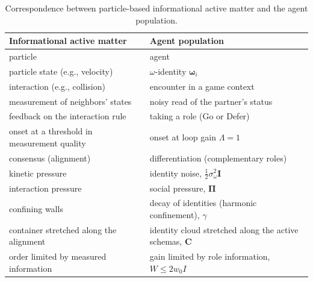 \documentclass[
  aps,prx,
  reprint,
  superscriptaddress,
  nofootinbib,
  longbibliography
]{revtex4-2}
\newcommand{\w}{\bm{\omega}}
\newcommand{\C}{\mathbf{C}}
\newcommand{\Id}{\mathbf{I}}
\newcommand{\sidn}{\sigma_{\omega}}
\begin{document}
\begin{table}[t]
\caption{Correspondence between particle-based informational active matter \cite{vansaders2023,ziepke2022} and the agent population.}
\label{tab:map}
\centering
{}
\begin{tabular}{>{\raggedright\arraybackslash}p{}>{\raggedright\arraybackslash}p{}}
\hline\hline
Informational active matter & Agent population\\
\hline
particle & agent\\
particle state (e.g., velocity) & $\omega$-identity $\w_i$\\
interaction (e.g., collision) & encounter in a game context\\
measurement of neighbors' states & noisy read of the partner's status\\
feedback on the interaction rule & taking a role (Go or Defer)\\
onset at a threshold in measurement quality & onset at loop gain $\Lambda=1$\\
consensus (alignment) & differentiation (complementary roles)\\
kinetic pressure & identity noise, $\tfrac12\sidn^2\Id$\\
interaction pressure & social pressure, $\bm{\Pi}$\\
confining walls & decay of identities (harmonic confinement), $\gamma$\\
container stretched along the alignment & identity cloud stretched along the active schemas, $\C$\\
order limited by measured information & gain limited by role information, $W\le2w_0I$\\
\hline\hline
\end{tabular}
\end{table}
\end{document}
